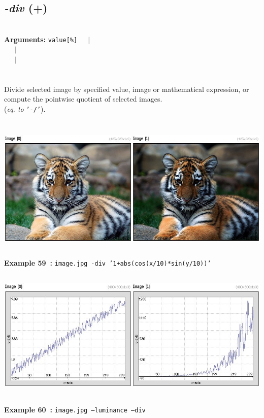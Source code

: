 \documentclass[a4paper,11pt,twoside]{book}
\begin{document}
\subsection{\emph{-div} (+)}\vspace*{-0.5em}
~\\\textbf{Arguments: } 
{\small \texttt{value[\%]}}~~~$|$\\
\hspace*{2.2cm}{\small \texttt{[image]}}~~~$|$\\
~~~$|$\\
\\~\\
Divide selected image by specified value, image or mathematical expression,
or compute the pointwise quotient of selected images.
~\\(\emph{eq. to} {\small \texttt{'-/'}}).
\begin{center}\includegraphics[keepaspectratio=true,height=7cm,width=\textwidth]{img/gmic_def59.jpg}\\
{\footnotesize \textbf{Example 59~:} \texttt{image.jpg -div '1+abs(cos(x/10)*sin(y/10))'}}
\\\includegraphics[keepaspectratio=true,height=7cm,width=\textwidth]{img/gmic_def60.jpg}\\
{\footnotesize \textbf{Example 60~:} \texttt{image.jpg --luminance --div}}
\end{center}
\end{document}
